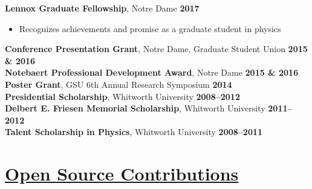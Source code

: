 \documentclass[margin]{res}
\begin{document}
\begin{resume}
{\bf Lennox Graduate Fellowship}, Notre Dame \hfill {\bf 2017}
    \begin{itemize}  \itemsep -2pt %
     \item[] Recognizes achievements and promise as a graduate student in physics
    \end{itemize} \vspace{-12pt}
{\bf Conference Presentation Grant}, Notre Dame, Graduate Student Union  \hfill {\bf 2015 \& 2016}\\
{\bf Notebaert Professional Development Award}, Notre Dame \hfill {\bf 2015 \& 2016}\\
{\bf Poster Grant}, GSU 6th Annual Research Symposium \hfill {\bf 2014}\\
{\bf Presidential Scholarship}, Whitworth University \hfill {\bf2008--2012}\\
{\bf Delbert E. Friesen Memorial Scholarship}, Whitworth University \hfill {\bf2011--2012}\\
{\bf Talent Scholarship in Physics}, Whitworth University \hfill {\bf2008--2011}




\section{\href{https://github.com/benjaminrose}{Open Source Contributions}}


\end{resume}
\end{document}
